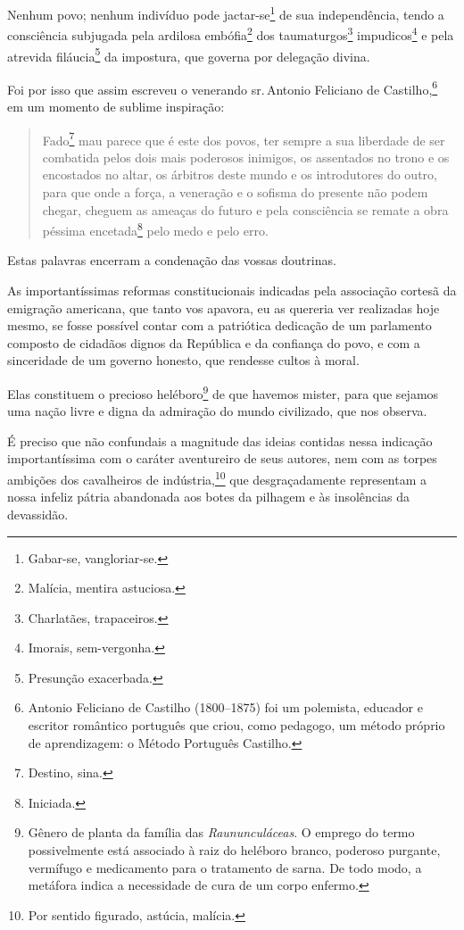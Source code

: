 Nenhum povo; nenhum indivíduo pode jactar-se\footnote{Gabar-se,
  vangloriar-se.} de sua independência, tendo a consciência subjugada
pela ardilosa embófia\footnote{Malícia, mentira astuciosa.} dos
taumaturgos\footnote{Charlatães, trapaceiros.} impudicos\footnote{
  Imorais, sem-vergonha.} e pela atrevida filáucia\footnote{Presunção
  exacerbada.} da impostura, que governa por delegação divina.

Foi por isso que assim escreveu o venerando sr.\,Antonio Feliciano de
Castilho,\footnote{Antonio Feliciano de Castilho (1800--1875) foi um
  polemista, educador e escritor romântico português que criou, como
  pedagogo, um método próprio de aprendizagem: o Método Português
  Castilho.} em um momento de sublime inspiração:

\begin{quote}
Fado\footnote{Destino, sina.} mau parece que é este dos povos, ter
sempre a sua liberdade de ser combatida pelos dois mais poderosos
inimigos, os assentados no trono e os encostados no altar, os árbitros
deste mundo e os introdutores do outro, para que onde a força, a
veneração e o sofisma do presente não podem chegar, cheguem as ameaças
do futuro e pela consciência se remate a obra péssima
encetada\footnote{Iniciada.} pelo medo e pelo erro.
\end{quote}

Estas palavras encerram a condenação das vossas doutrinas.

As importantíssimas reformas constitucionais indicadas pela associação
cortesã da emigração americana, que tanto vos apavora, eu as quereria
ver realizadas hoje mesmo, se fosse possível contar com a patriótica
dedicação de um parlamento composto de cidadãos dignos da República e da
confiança do povo, e com a sinceridade de um governo honesto, que
rendesse cultos à moral.

Elas constituem o precioso heléboro\footnote{Gênero de planta da \label{heleboro}
  família das \emph{Raununculáceas}. O emprego do termo possivelmente
  está associado à raiz do heléboro branco, poderoso purgante, vermífugo
  e medicamento para o tratamento de sarna. De todo modo, a metáfora
  indica a necessidade de cura de um corpo enfermo.} de que havemos
mister, para que sejamos uma nação livre e digna da admiração do mundo
civilizado, que nos observa.

É preciso que não confundais a magnitude das ideias contidas nessa
indicação importantíssima com o caráter aventureiro de seus autores, nem
com as torpes ambições dos cavalheiros de indústria,\footnote{Por
  sentido figurado, astúcia, malícia.} que desgraçadamente representam
a nossa infeliz pátria abandonada aos botes da pilhagem e às insolências
da devassidão.

